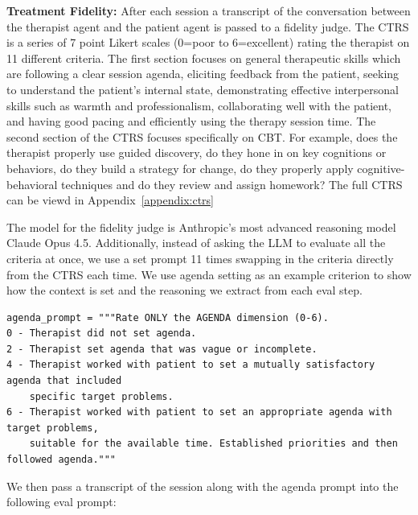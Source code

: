 \documentclass[twoside]{report}
\begin{document}
\textbf{Treatment Fidelity:} After each session a transcript of the conversation between the therapist agent and the patient agent is passed to a fidelity judge. The CTRS is a series of 7 point Likert scales (0=poor to 6=excellent) rating the therapist on 11 different criteria. The first section focuses on general therapeutic skills which are following a clear session agenda, eliciting feedback from the patient, seeking to understand the patient's internal state, demonstrating effective interpersonal skills such as warmth and professionalism, collaborating well with the patient, and having good pacing and efficiently using the therapy session time. The second section of the CTRS focuses specifically on CBT. For example, does the therapist properly use guided discovery, do they hone in on key cognitions or behaviors, do they build a strategy for change, do they properly apply cognitive-behavioral techniques and do they review and assign homework?
The full CTRS can be viewd in Appendix~\ref{appendix:ctrs}

The model for the fidelity judge is Anthropic's most advanced reasoning model Claude Opus 4.5. Additionally, instead of asking the LLM to evaluate all the criteria at once, we use a set prompt 11 times swapping in the criteria directly from the CTRS each time. We use agenda setting as an example criterion to show how the context is set and the reasoning we extract from each eval step.

\begin{verbatim}
agenda_prompt = """Rate ONLY the AGENDA dimension (0-6).
0 - Therapist did not set agenda.
2 - Therapist set agenda that was vague or incomplete.
4 - Therapist worked with patient to set a mutually satisfactory agenda that included 
	specific target problems.
6 - Therapist worked with patient to set an appropriate agenda with target problems, 
	suitable for the available time. Established priorities and then followed agenda."""
\end{verbatim}

We then pass a transcript of the session along with the agenda prompt into the following eval prompt: 
\end{document}
